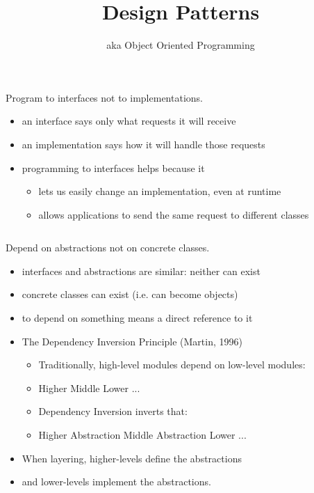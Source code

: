 \documentclass{beamer}
\title{Design Patterns}
\subtitle{aka Object Oriented Programming}
\begin{document}
\begin{frame}
  \titlepage
\end{frame}

\begin{frame}{Program to interfaces not to implementations.}
    \begin{itemize}
        \item an interface says only what requests it will receive
        \item an implementation says how it will handle those requests
        \item programming to interfaces helps because it
            \begin{itemize}
                \item lets us easily change an implementation, even at runtime
                \item allows applications to send the same request to different classes
            \end{itemize}
    \end{itemize}
\end{frame}

\begin{frame}[plain]
    \begin{columns}
        \column{\dimexpr\paperwidth-40pt}
        
    \end{columns}
\end{frame}

\begin{frame}{Depend on abstractions not on concrete classes.}
    \begin{itemize}
        \item interfaces and abstractions are similar: neither can exist
        \item concrete classes can exist (i.e. can become objects)
        \item to depend on something means a direct reference to it
        \item The Dependency Inversion Principle (Martin, 1996)
        \begin{itemize}
            \item Traditionally, high-level modules depend on low-level modules:
            \item Higher \textrightarrow{} Middle \textrightarrow{} Lower \textrightarrow{} ...
            \item Dependency Inversion inverts that:
            \item Higher \textrightarrow{} Abstraction \textleftarrow{} Middle \textrightarrow{} Abstraction \textleftarrow{} Lower ...
        \end{itemize}
        \item When layering, higher-levels define the abstractions
        \item and lower-levels implement the abstractions.
    \end{itemize}
\end{frame}
\end{document}
